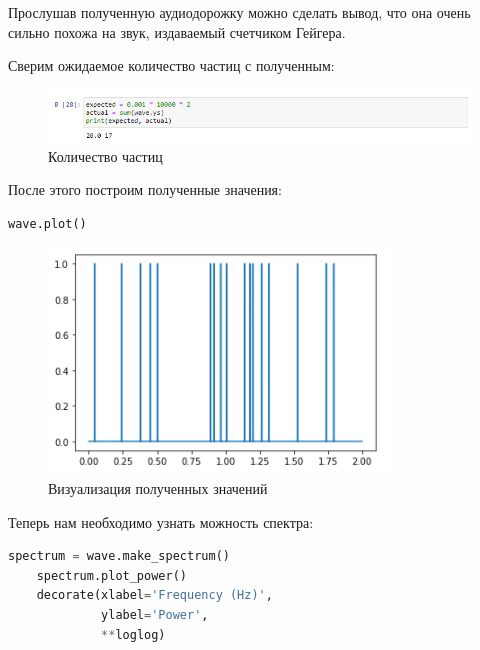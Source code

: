 \documentclass[a4paper]{article}
\begin{document}
            Прослушав полученную аудиодорожку можно сделать вывод, что она очень сильно похожа на звук, издаваемый счетчиком Гейгера.
            
            Сверим ожидаемое количество частиц с полученным:
            
             \begin{figure}[H]
                \centering
                \includegraphics[width=\textwidth]{ex_4_signal_particles .png}
                \caption{Количество частиц}
                \label{fig:ex_4_signal_particles}
            \end{figure}
            
            После этого построим полученные значения:
            
\begin{lstlisting}[language=Python, caption= Визуализация полученных значений]
    wave.plot()
\end{lstlisting}               
            
            \begin{figure}[H]
                \centering
                \includegraphics{ex_4_signal_wave_plot.png}
                \caption{Визуализация полученных значений}
                \label{fig:ex_4_signal_wave_plot}
            \end{figure}
            
            Теперь нам необходимо узнать можность спектра:
            
\begin{lstlisting}[language=Python, caption= Мощность спектра]
    spectrum = wave.make_spectrum()
    spectrum.plot_power()
    decorate(xlabel='Frequency (Hz)',
             ylabel='Power',
             **loglog)
\end{lstlisting}               
            
\end{document}
